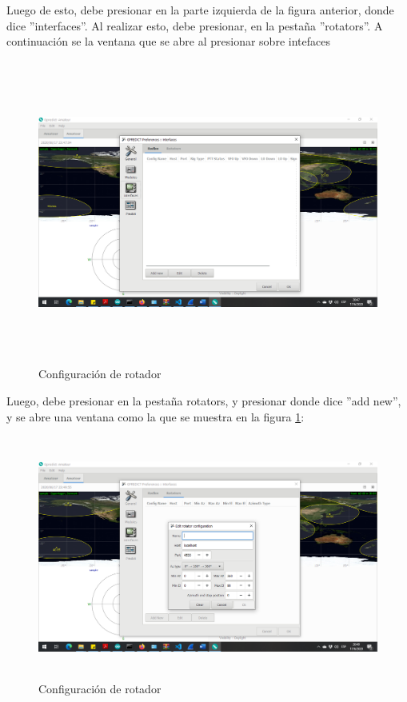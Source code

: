 Luego de esto, debe presionar en la parte izquierda de la figura anterior, donde dice ''interfaces''. Al realizar esto, debe presionar, en la pestaña ''rotators''. A continuación se la ventana que se abre al presionar sobre intefaces
\begin{figure}[H]
	\includegraphics[height=10cm,width=\textwidth]{rotators_int}
	\caption{Configuración de rotador}
\end{figure} 

Luego, debe presionar en la pestaña rotators, y presionar donde dice ''add new'', y se abre una ventana como la que se muestra en la figura \ref{fig:conf_rot_ip}: 

\begin{figure}[h]
	\includegraphics[height=8cm]{conf_rot}
	\caption{Configuración de rotador}
	\label{fig:conf_rot_ip}
\end{figure} 

